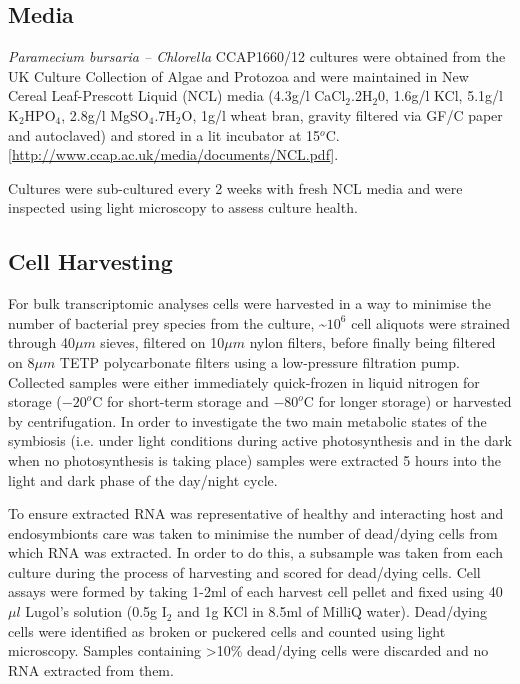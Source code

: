 \subsection{Media}
\textit{Paramecium bursaria – Chlorella} CCAP1660/12 cultures were obtained from 
the UK Culture Collection of Algae and Protozoa and were maintained in 
New Cereal Leaf-Prescott Liquid (NCL) media 
(4.3g/l CaCl$_{2}$.2H$_{2}$0, 1.6g/l KCl, 5.1g/l K$_{2}$HPO$_{4}$, 2.8g/l MgSO$_{4}$.7H$_{2}$O, 
1g/l wheat bran, gravity filtered via GF/C paper and autoclaved) and stored in 
a lit incubator at 15$^{o}$C. [\url{http://www.ccap.ac.uk/media/documents/NCL.pdf}].  

Cultures were sub-cultured every 2 weeks with fresh NCL media and were 
inspected using light microscopy to assess culture health.  

\subsection{Cell Harvesting}
For bulk transcriptomic analyses cells were harvested in a way to minimise the 
number of bacterial prey species from the culture, \textasciitilde $10^{6}$ 
cell aliquots were strained through 40$\mu m$ sieves, filtered on 
10$\mu m$ nylon filters, 
before finally being filtered on 8$\mu m$ TETP polycarbonate filters using a 
low-pressure filtration pump.  Collected samples were either immediately 
quick-frozen in liquid nitrogen for storage ($-20^{o}$C for short-term storage 
and $-80^{o}$C for longer storage) or harvested by centrifugation.  
In order to investigate the two main metabolic states of the symbiosis 
(i.e. under light conditions during active photosynthesis and in the dark 
when no photosynthesis is taking place) samples were extracted 5 hours into 
the light and dark phase of the day/night cycle.

To ensure extracted RNA was representative of healthy and interacting host 
and endosymbionts care was taken to minimise the number of dead/dying cells 
from which RNA was extracted.  In order to do this, a subsample was taken 
from each culture during the process of harvesting and scored for dead/dying cells.  
Cell assays were formed by taking 1-2ml of each harvest cell pellet and 
fixed using 40$\mu l$ Lugol's solution (0.5g I$_{2}$ and 1g KCl in 8.5ml 
of MilliQ water). Dead/dying cells were identified as broken or puckered cells 
and counted using light microscopy.  Samples containing >10\% dead/dying cells 
were discarded and no RNA extracted from them.

